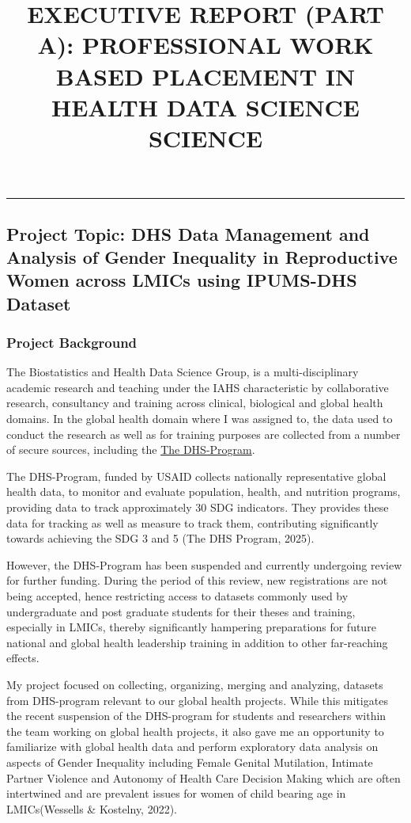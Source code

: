 \documentclass[
]{article}
\title{EXECUTIVE REPORT (PART A): PROFESSIONAL WORK BASED PLACEMENT IN
HEALTH DATA SCIENCE SCIENCE}
\author{}
\date{\vspace{-2.5em}}
\begin{document}
\maketitle

\begin{center}\rule{0.5\linewidth}{0.5pt}\end{center}

\subsection{Project Topic: DHS Data Management and Analysis of Gender
Inequality in Reproductive Women across LMICs using IPUMS-DHS
Dataset}\label{project-topic-dhs-data-management-and-analysis-of-gender-inequality-in-reproductive-women-across-lmics-using-ipums-dhs-dataset}

\subsubsection{Project Background}\label{project-background}

The Biostatistics and Health Data Science Group, is a multi-disciplinary
academic research and teaching under the IAHS characteristic by
collaborative research, consultancy and training across clinical,
biological and global health domains. In the global health domain where
I was assigned to, the data used to conduct the research as well as for
training purposes are collected from a number of secure sources,
including the \href{https://dhsprogram.com}{The DHS-Program}.

The DHS-Program, funded by USAID collects nationally representative
global health data, to monitor and evaluate population, health, and
nutrition programs, providing data to track approximately 30 SDG
indicators. They provides these data for tracking as well as measure to
track them, contributing significantly towards achieving the SDG 3 and 5
(The DHS Program, 2025).

However, the DHS-Program has been suspended and currently undergoing
review for further funding. During the period of this review, new
registrations are not being accepted, hence restricting access to
datasets commonly used by undergraduate and post graduate students for
their theses and training, especially in LMICs, thereby significantly
hampering preparations for future national and global health leadership
training in addition to other far-reaching effects.

My project focused on collecting, organizing, merging and analyzing,
datasets from DHS-program relevant to our global health projects. While
this mitigates the recent suspension of the DHS-program for students and
researchers within the team working on global health projects, it also
gave me an opportunity to familiarize with global health data and
perform exploratory data analysis on aspects of Gender Inequality
including Female Genital Mutilation, Intimate Partner Violence and
Autonomy of Health Care Decision Making which are often intertwined and
are prevalent issues for women of child bearing age in LMICs(Wessells \&
Kostelny, 2022).
\end{document}
